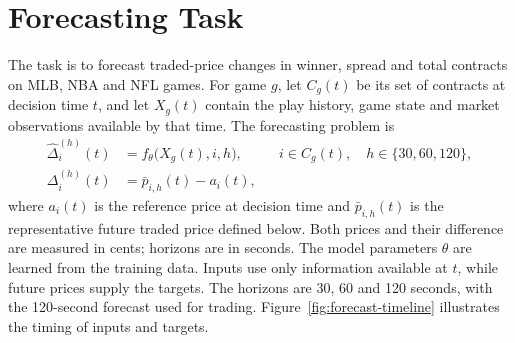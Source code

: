 \documentclass[12pt,a4paper,oneside]{report}
\begin{document}
\section{Forecasting Task}\label{sec:task}
The task is to forecast traded-price changes in winner, spread and total
contracts on MLB, NBA and NFL games. For game $g$, let $C_g(t)$ be its set of
contracts at decision time $t$, and let $X_g(t)$ contain the play history, game
state and market observations available by that time. The forecasting problem is
\begin{align}
  \widehat\Delta_i^{(h)}(t) &= f_\theta\bigl(X_g(t),i,h\bigr),
  && i\in C_g(t),\quad h\in\{30,60,120\},
  \label{eq:forecast-mapping}\\
  \Delta_i^{(h)}(t) &= \bar p_{i,h}(t)-a_i(t),
  \label{eq:forecast-target}
\end{align}
where $a_i(t)$ is the reference price at decision time and $\bar p_{i,h}(t)$ is
the representative future traded price defined below. Both prices and their
difference are measured in cents; horizons are in seconds. The model parameters
$\theta$ are learned from the training data. Inputs use only information available
at $t$, while future prices supply the targets. The horizons are
30, 60 and 120 seconds, with the 120-second forecast used for trading.
Figure~\ref{fig:forecast-timeline} illustrates the timing of inputs and targets.
\end{document}
